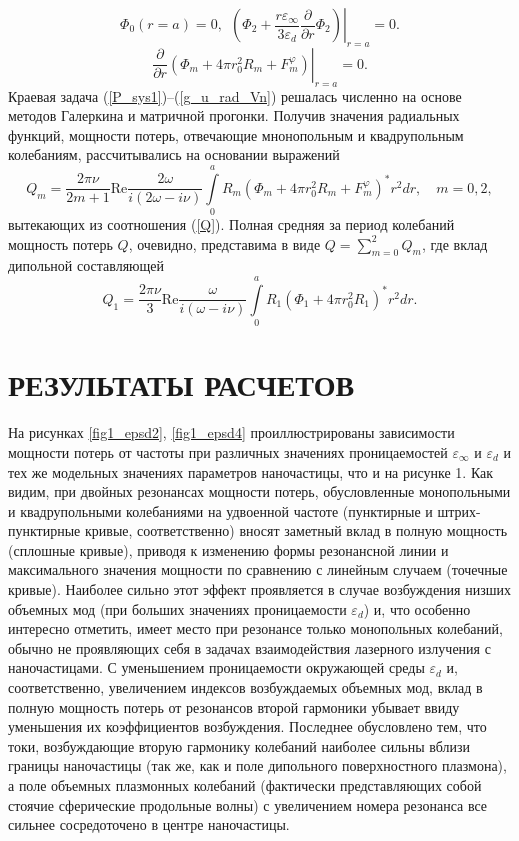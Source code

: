 \documentclass[12pt, a4paper]{article}
\def \eps {\varepsilon}
\def \w {\omega}
\def \ph {\varphi}
\begin{document}
\begin{equation}
\Phi_0(r=a) = 0,~~	\left.\left( \Phi_2 + \frac{r\varepsilon_\infty}{3\varepsilon_d} \frac{\partial}{\partial r} \Phi_2 \right) \right|_{r=a} = 0.
	\label{eq:potential_condition}
\end{equation}
\begin{equation}
	\label{g_u_rad_Vn}
	\left.\frac{\partial}{\partial r} \left( \Phi_m + 4\pi r_0^2 R_m + F_m^{\varphi} \right) \right|_{r=a} = 0.
\end{equation}
Краевая задача (\ref{P_sys1})--(\ref{g_u_rad_Vn}) решалась численно на основе методов Галеркина и матричной прогонки. Получив значения радиальных функций, мощности потерь, отвечающие мнонопольным и квадрупольным колебаниям, рассчитывались на основании выражений 
\begin{equation} 	
	Q_{m} = \frac{2\pi\nu}{2m+1}\mathrm{Re} \frac{2\w}{i(2\w - i \nu)} \int\limits_0^a R_m(\Phi_m  + 4\pi r_0^2R_m + F_m^\ph)^*r^2dr, \quad m=0,2,
\end{equation}
вытекающих из соотношения (\ref{Q}). Полная средняя за период колебаний мощность потерь $Q$, очевидно, представима в виде $Q = \sum_{m=0}^2 Q_m$, где вклад дипольной составляющей
\begin{equation} 
	Q_1 = \frac{2\pi\nu}{3} \mathrm{Re} \frac{\w}{i(\w - i\nu)} \int\limits_{0}^{a} R_{1}(\Phi_{1} + 4\pi r_{0}^{2}R_{1})^{*}r^{2}dr.
\end{equation}
\section{РЕЗУЛЬТАТЫ РАСЧЕТОВ}

На рисунках \ref{fig1_epsd2}, \ref{fig1_epsd4} проиллюстрированы зависимости мощности потерь от частоты при различных значениях проницаемостей $\eps_\infty$ и $\eps_d$ и тех же модельных значениях параметров наночастицы, что и на рисунке 1. Как видим, при двойных резонансах мощности потерь, обусловленные монопольными и квадрупольными колебаниями на удвоенной частоте (пунктирные и штрих-пунктирные кривые, соответственно) вносят заметный вклад в полную мощность (сплошные кривые), приводя к изменению формы резонансной линии и максимального значения мощности по сравнению с линейным случаем (точечные кривые). Наиболее сильно этот эффект проявляется в случае возбуждения низших объемных мод (при больших значениях проницаемости $\eps_d$) и, что особенно интересно отметить, имеет место при резонансе только монопольных колебаний, обычно не проявляющих себя в задачах взаимодействия лазерного излучения с наночастицами. С уменьшением проницаемости окружающей среды $\eps_d$ и, соответственно, увеличением индексов возбуждаемых объемных мод, вклад в полную мощность потерь от резонансов второй гармоники убывает ввиду уменьшения их коэффициентов возбуждения. Последнее обусловлено тем, что токи, возбуждающие вторую гармонику колебаний наиболее сильны вблизи границы наночастицы (так же, как и поле дипольного поверхностного плазмона), а поле объемных плазмонных колебаний (фактически представляющих собой стоячие сферические продольные волны) с увеличением номера резонанса все сильнее сосредоточено в центре наночастицы.
\end{document}
